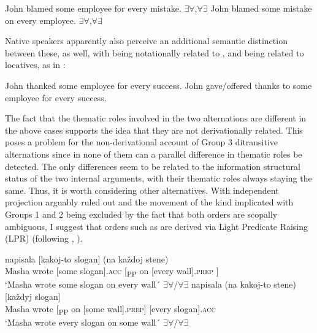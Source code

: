 \documentclass[output=paper,colorlinks,citecolor=brown]{./langscibook}
\begin{document}
\ea%
    \label{ex:antonyuk:57}
    \ea \label{ex:antonyuk:57a}
    John blamed some employee for every mistake. \hfill ${\exists}{\forall}$,${\forall}{\exists}$
    \ex \label{ex:antonyuk:57b}
    John blamed some mistake on every employee. \hfill ${\exists}{\forall}$,${\forall}{\exists}$
    \z
\z

Native speakers apparently also perceive an additional semantic distinction between these, as well, with  being notationally related to , and  being related to locatives, as in :


\ea%
    \label{ex:antonyuk:58}
    \ea \label{ex:antonyuk:58a}
    John thanked some employee for every success.
    \ex \label{ex:antonyuk:58b}
    John gave/offered thanks to some employee for every success.
    \z
\z

The fact that the thematic roles involved in the two alternations are different in the above cases supports the idea that they are not derivationally related. This poses a problem for the non-derivational account of Group 3 ditransitive alternations since in none of them can a parallel difference in thematic roles be detected. The only differences seem to be related to the information structural status of the two internal arguments, with their thematic roles always staying the same. Thus, it is worth considering other alternatives. With independent projection arguably ruled out and the movement of the kind implicated with Groups 1 and 2 being excluded by the fact that both orders are scopally ambiguous, I suggest that orders such as  are derived via Light Predicate Raising (LPR) (following \citealt{Larson1989}, \citeyear{Larson2014}).


\ea%
    \label{ex:antonyuk:59}
    \ea \label{ex:antonyuk:59a}
      {napisala} {[kakoj-to} {slogan]}   {}    {(na} {každoj} {stene)}\\
    Masha wrote    [some     slogan].\textsc{acc} [\textsubscript{PP} on [every wall].\textsc{prep} ]\\
    \glt `Masha wrote some slogan on every wall´ \hfill ${\exists}{\forall}$/${\forall}{\exists}$
    \ex \label{ex:antonyuk:59b}
     {napisala} {} {(na}  {kakoj-to} {stene)}        {[každyj} {slogan]}\\
    Masha wrote [\textsubscript{PP} on [some     wall].\textsc{prep}] [every slogan].\textsc{acc}\\
    \glt `Masha wrote every slogan on some wall´ \hfill ${\exists}{\forall}$/${\forall}{\exists}$
    \z
\z
\end{document}
